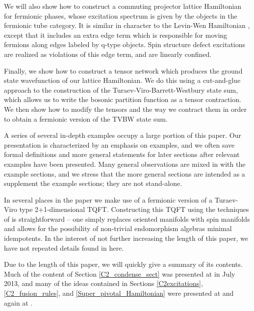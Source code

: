 We will also show how to construct a commuting projector lattice Hamiltonian 
for fermionic phases, whose excitation spectrum is given by the objects in the fermionic tube category.  
It is similar in character to the Levin-Wen Hamiltonian \cite{levin2005}, 
except that it includes an extra edge term which is responsible for moving fermions along
edges labeled by q-type objects. 
Spin structure defect excitations 
are realized as violations of this edge term, and are linearly confined. 

Finally, we show how to construct a tensor network which produces the ground state 
wavefunction of our lattice Hamiltonian. We do this using a cut-and-glue approach to 
the construction of the Turaev-Viro-Barrett-Westbury state sum, which allows us to write the bosonic partition function
as a tensor contraction. We then show how to modify the tensors 
and the way we contract them in order to obtain a fermionic version of the TVBW state sum.  

A series of several in-depth examples occupy a large portion 
of this paper.
Our presentation is characterized by an emphasis on examples, 
and we often save formal definitions and more general statements 
for later sections after relevant examples have been presented.  
Many general observations are mixed in with the example sections,
and we stress that the more general sections are intended as a supplement
the example sections; they are not stand-alone.

In several places in the paper we make use of a fermionic version of a Turaev-Viro type 2+1-dimensional TQFT.
Constructing this TQFT using the techniques of \cite{Walker2006} is straightforward -- one simply replaces oriented manifolds with
spin manifolds and allows for the possibility of non-trivial endomorphism algebras minimal idempotents.
In the interest of not further increasing the length of this paper, we have not repeated details found in
\cite{Walker2006} here.

Due to the length of this paper, we will quickly give a summary of its contents.
Much of the content of Section \ref{C2_condense_sect} was presented at \cite{Walker2013} in July 2013,
and many of the ideas contained in Sections \ref{C2excitations}, \ref{C2_fusion_rules}, and \ref{Super_pivotal_Hamiltonian} were presented at \cite{Walker2014} and again
at \cite{Walker2015}.

